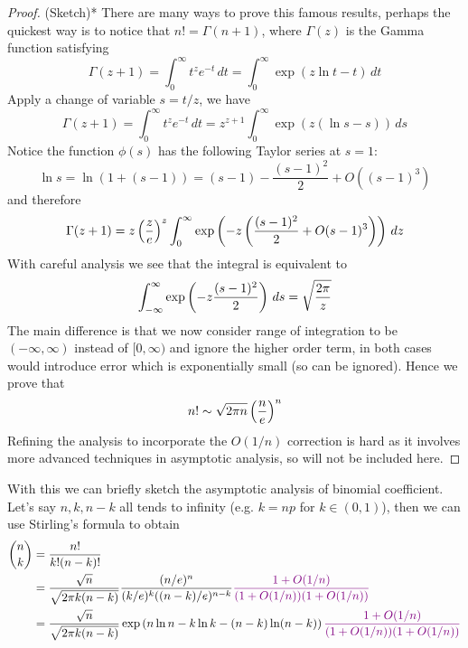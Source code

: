 \begin{unexaminable}
\begin{proof} (Sketch)* There are many ways to prove this famous results, perhaps the quickest way is to notice that $n! = \Gamma(n+1)$, where $\Gamma(z)$ is the Gamma function satisfying
\begin{equation}
    \Gamma(z+1) = \int_0^\infty t^z e^{-t} \, dt = \int_0^\infty \exp(z \ln t - t) \, dt
\end{equation}
Apply a change of variable $s = t/z$, we have
\begin{equation}
    \Gamma(z+1) = \int_0^\infty t^z e^{-t} \, dt = z^{z+1}\int_0^\infty \exp(z(\ln s - s)) \, ds
\end{equation}
Notice the function $\phi(s)$ has the following Taylor series at $s = 1$:
\begin{equation}
    \ln s = \ln (1+(s-1)) = (s - 1) - \frac{(s-1)^2}{2} + O((s-1)^3)
\end{equation}
and therefore
\begin{equation}
    \Gamma(z+1) = z\left( \frac{z}{e} \right)^z \int_0^\infty \exp\left( -z \left( \frac{(s-1)^2}{2} + O(s-1)^3 \right) \right) \, dz
\end{equation}
With careful analysis we see that the integral is equivalent to 
\begin{equation}
    \int_{-\infty}^\infty \exp\left( -z\frac{(s-1)^2}{2} \right) \, ds = \sqrt{\frac{2\pi}{z}}
\end{equation}
The main difference is that we now consider range of integration to be $(-\infty, \infty)$ instead of $[0,\infty)$ and ignore the higher order term, in both cases would introduce error which is exponentially small (so can be ignored). Hence we prove that
\begin{equation}
    n! \sim \sqrt{2\pi n} \left( \frac{n}{e} \right)^n
\end{equation}
Refining the analysis to incorporate the $O(1/n)$ correction is hard as it involves more advanced techniques in asymptotic analysis, so will not be included here.
\end{proof}
\end{unexaminable}

With this we can briefly sketch the asymptotic analysis of binomial coefficient. Let's say $n,k,n-k$ all tends to infinity (e.g. $k = np$ for $k \in (0,1)$), then we can use Stirling's formula to obtain
\begin{align*}
    {n\choose k} &= \frac{n!}{k! (n-k)!} \\
    &= \frac{\sqrt{n}}{\sqrt{2\pi k(n-k)}} \frac{(n/e)^n}{(k/e)^k ((n-k)/e)^{n-k}} \textcolor{violet}{\frac{1+O(1/n)}{(1+O(1/n))(1+O(1/n))}}\\
    &= \frac{\sqrt{n}}{\sqrt{2\pi k(n-k)}}  \exp\left( n \ln n - k \ln k - (n-k) \ln (n-k) \right)\textcolor{violet}{\frac{1+O(1/n)}{(1+O(1/n))(1+O(1/n))}}
\end{align*}

